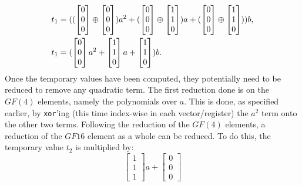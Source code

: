 \begin{equation*}
\begin{split}
        t_1 &= ((\begin{bmatrix} 0\\ 0\\ 0 \end{bmatrix} \oplus \begin{bmatrix} 0\\ 0\\ 0 \end{bmatrix})a^2 + (\begin{bmatrix} 0\\ 0\\ 0 \end{bmatrix} \oplus \begin{bmatrix} 1\\ 1\\ 0 \end{bmatrix})a + (\begin{bmatrix} 0\\ 0\\ 0 \end{bmatrix} \oplus \begin{bmatrix} 1\\ 1\\ 0 \end{bmatrix}))b,\\
        t_1 &= (\begin{bmatrix} 0\\ 0\\ 0 \end{bmatrix}a^2 + \begin{bmatrix} 1\\ 1\\ 0 \end{bmatrix}a + \begin{bmatrix} 1\\ 1\\ 0 \end{bmatrix})b.
    \end{split}
\end{equation*}
Once the temporary values have been computed, they potentially need to be reduced to remove any quadratic term. The first reduction done is on the $GF(4)$ elements, namely the polynomials over $a$. This is done, as specified earlier, by \texttt{xor}'ing (this time index-wise in each vector/register) the $a^2$ term onto the other two terms. Following the reduction of the $GF(4)$ elements, a reduction of the $GF16$ element as a whole can be reduced. To do this, the temporary value $t_2$ is multiplied by:
$$
    \begin{bmatrix}
        1\\
        1\\
        1
    \end{bmatrix}a 
    + 
    \begin{bmatrix}
        0\\
        0\\
        0
    \end{bmatrix}
$$
